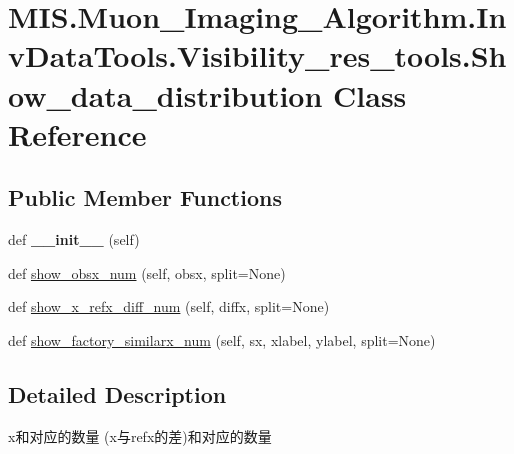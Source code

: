 \hypertarget{classMIS_1_1Muon__Imaging__Algorithm_1_1InvDataTools_1_1Visibility__res__tools_1_1Show__data__distribution}{}\section{M\+I\+S.\+Muon\+\_\+\+Imaging\+\_\+\+Algorithm.\+Inv\+Data\+Tools.\+Visibility\+\_\+res\+\_\+tools.\+Show\+\_\+data\+\_\+distribution Class Reference}
\label{classMIS_1_1Muon__Imaging__Algorithm_1_1InvDataTools_1_1Visibility__res__tools_1_1Show__data__distribution}
\subsection*{Public Member Functions}
\begin{DoxyCompactItemize}
\item 
\mbox{\label{classMIS_1_1Muon__Imaging__Algorithm_1_1InvDataTools_1_1Visibility__res__tools_1_1Show__data__distribution_ac8a81e1dc04231aadc161684c8cf4485}} 
def {\bfseries \+\_\+\+\_\+init\+\_\+\+\_\+} (self)
\item 
def \hyperlink{classMIS_1_1Muon__Imaging__Algorithm_1_1InvDataTools_1_1Visibility__res__tools_1_1Show__data__distribution_a00454f28fa2d2d482d206682c122277b}{show\+\_\+obsx\+\_\+num} (self, obsx, split=None)
\item 
def \hyperlink{classMIS_1_1Muon__Imaging__Algorithm_1_1InvDataTools_1_1Visibility__res__tools_1_1Show__data__distribution_a5f3f855ce903237e37a687a7500d82d1}{show\+\_\+x\+\_\+refx\+\_\+diff\+\_\+num} (self, diffx, split=None)
\item 
def \hyperlink{classMIS_1_1Muon__Imaging__Algorithm_1_1InvDataTools_1_1Visibility__res__tools_1_1Show__data__distribution_a5502f93616c6c38a5917205eb5830feb}{show\+\_\+factory\+\_\+similarx\+\_\+num} (self, sx, xlabel, ylabel, split=None)
\end{DoxyCompactItemize}


\subsection{Detailed Description}
\begin{DoxyVerb}x和对应的数量   (x与refx的差)和对应的数量\end{DoxyVerb}
 

